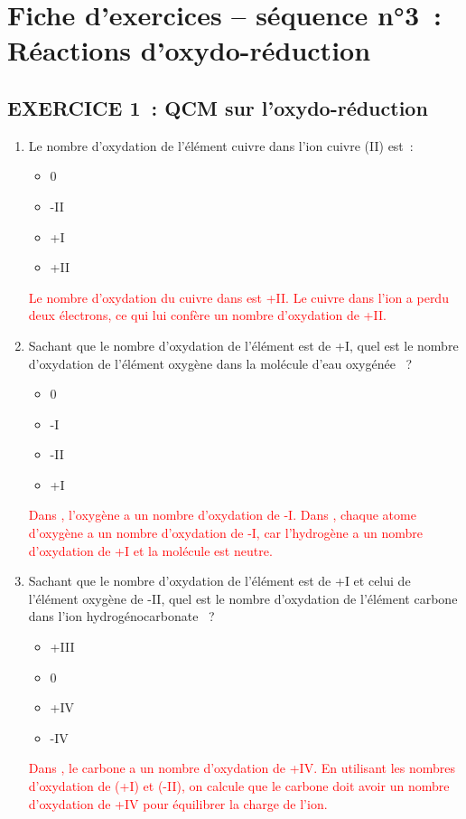 \documentclass[10pt,a4paper]{article}
\begin{document}
\section*{Fiche d'exercices -- séquence n°3~: Réactions d'oxydo-réduction}

\subsection*{EXERCICE 1~: QCM sur l'oxydo-réduction}

\begin{enumerate}
    \item Le nombre d'oxydation de l'élément cuivre dans l'ion cuivre (II) est~:
    \begin{itemize}
        \item[$\square$] 0
        \item[$\square$] -II
        \item[$\square$] +I
        \item[$\square$] +II
    \end{itemize}
    \textcolor{red}{Le nombre d'oxydation du cuivre dans  est +II.}
    \textcolor{red}{Le cuivre dans l'ion  a perdu deux électrons, ce qui lui confère un nombre d'oxydation de +II.}

    \item Sachant que le nombre d'oxydation de l'élément  est de +I, quel est le nombre d'oxydation de l'élément oxygène  dans la molécule d'eau oxygénée ~?
    \begin{itemize}
        \item[$\square$] 0
        \item[$\square$] -I
        \item[$\square$] -II
        \item[$\square$] +I
    \end{itemize}
    \textcolor{red}{Dans , l'oxygène a un nombre d'oxydation de -I.}
    \textcolor{red}{Dans , chaque atome d'oxygène a un nombre d'oxydation de -I, car l'hydrogène a un nombre d'oxydation de +I et la molécule est neutre.}

    \item Sachant que le nombre d'oxydation de l'élément  est de +I et celui de l'élément oxygène de -II, quel est le nombre d'oxydation de l'élément carbone dans l'ion hydrogénocarbonate ~?
    \begin{itemize}
        \item[$\square$] +III
        \item[$\square$] 0
        \item[$\square$] +IV
        \item[$\square$] -IV
    \end{itemize}
    \textcolor{red}{Dans , le carbone a un nombre d'oxydation de +IV.}
    \textcolor{red}{En utilisant les nombres d'oxydation de  (+I) et  (-II), on calcule que le carbone doit avoir un nombre d'oxydation de +IV pour équilibrer la charge de l'ion.}


\end{enumerate}
\end{document}
